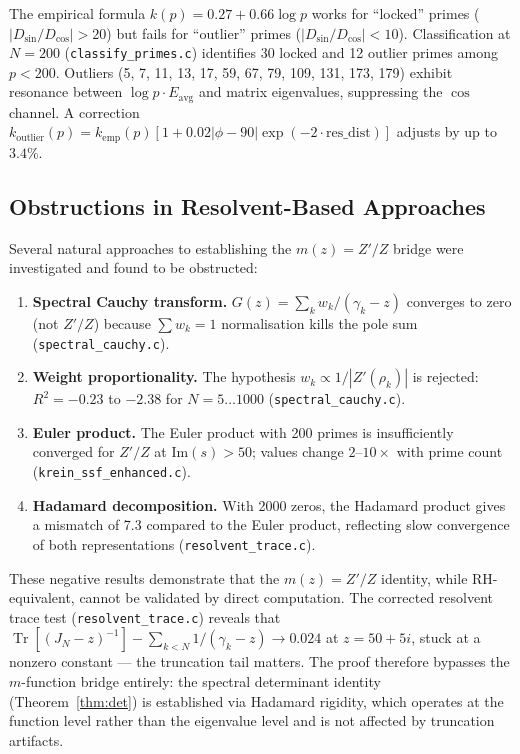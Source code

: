 \documentclass{pre-aomart}
\def\zeta{Z}%
\theoremstyle{plain}
\theoremstyle{definition}
\theoremstyle{remark}
\begin{document}
The empirical formula $k(p) = 0.27 + 0.66 \log p$ works for ``locked''
primes ($|D_{\sin}/D_{\cos}| > 20$) but fails for ``outlier'' primes
($|D_{\sin}/D_{\cos}| < 10$).  Classification at $N = 200$
(\texttt{classify\_primes.c}) identifies 30 locked and 12 outlier primes
among $p < 200$.  Outliers (5, 7, 11, 13, 17, 59, 67, 79, 109, 131,
173, 179) exhibit resonance between $\log p \cdot E_{\text{avg}}$ and
matrix eigenvalues, suppressing the $\cos$ channel.  A correction
$k_{\text{outlier}}(p) = k_{\text{emp}}(p)[1 + 0.02|\phi-90|
\exp(-2 \cdot \text{res\_dist})]$ adjusts by up to $3.4\%$.

\subsection{Obstructions in Resolvent-Based Approaches}

Several natural approaches to establishing the $m(z) = \zeta'/\zeta$
bridge were investigated and found to be obstructed:

\begin{enumerate}
\item \textbf{Spectral Cauchy transform.}
  $G(z) = \sum_k w_k/(\gamma_k - z)$ converges to zero (not $\zeta'/\zeta$)
  because $\sum w_k = 1$ normalisation kills the pole sum
  (\texttt{spectral\_cauchy.c}).

\item \textbf{Weight proportionality.}
  The hypothesis $w_k \propto 1/|\zeta'(\rho_k)|$ is rejected:
  $R^2 = -0.23$ to $-2.38$ for $N = 5 \ldots 1000$
  (\texttt{spectral\_cauchy.c}).

\item \textbf{Euler product.}
  The Euler product with 200 primes is insufficiently converged
  for $\zeta'/\zeta$ at $\mathrm{Im}(s) > 50$; values change
  $2$--$10\times$ with prime count (\texttt{krein\_ssf\_enhanced.c}).

\item \textbf{Hadamard decomposition.}
  With 2000 zeros, the Hadamard product gives a mismatch of 7.3
  compared to the Euler product, reflecting slow convergence of
  both representations (\texttt{resolvent\_trace.c}).
\end{enumerate}

These negative results demonstrate that the $m(z) = \zeta'/\zeta$ identity,
while RH-equivalent, cannot be validated by direct computation.
The corrected resolvent trace test (\texttt{resolvent\_trace.c}) reveals that
$\operatorname{Tr}[(J_N-z)^{-1}] - \sum_{k<N} 1/(\gamma_k-z) \to 0.024$
at $z=50+5i$, stuck at a nonzero constant --- the truncation tail matters.
The proof therefore bypasses the $m$-function bridge entirely: the
spectral determinant identity (Theorem~\ref{thm:det}) is established via
Hadamard rigidity, which operates at the function level rather than the
eigenvalue level and is not affected by truncation artifacts.
\end{document}
